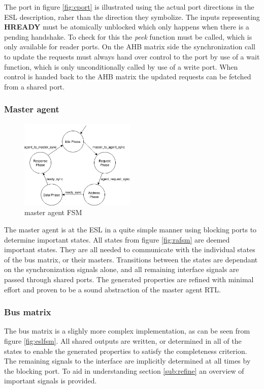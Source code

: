 The port in figure \ref{fig:cport} is illustrated using the actual port directions in the ESL description, raher than the direction they symbolize. The inputs representing \textbf{HREADY} must be atomically unblocked which only happens when there is a pending handshake. To check for this the \textit{peek} function must be called, which is only available for reader ports. On the AHB matrix side the synchronization call to update the requests must always hand over control to the port by use of a wait function, which is only unconditionally called by use of a write port. When control is handed back to the AHB matrix the updated requests can be fetched from a shared port. 

\subsubsection{Master agent}
\begin{figure}
\includegraphics[width=5.5cm]{figs/ESL/mAgent_ESL.png}
\caption{master agent FSM}\label{fig:eafsm}
\end{figure}
The master agent is at the ESL in a quite simple manner using blocking ports to determine important states. All states from figure \ref{fig:rafsm} are deemed important states. They are all needed to communicate with the individual states of the bus matrix, or their masters. Transitions between the states are dependant on the synchronization signals alone, and all remaining interface signals are passed through shared ports. The generated properties are refined with minimal effort and proven to be a sound abstraction of the master agent RTL.  \\
\newline  

\subsubsection{Bus matrix}
The bus matrix is a slighly more complex implementation, as can be seen from figure \ref{fig:eslfsm}. All shared outputs are written, or determined in all of the states to enable the generated properties to satisfy the completeness criterion. The remaining signals to the interface are implicitly determined at all times by the blocking port. To aid in understanding section \ref{sub:refine} an overview of important signals is provided. 


